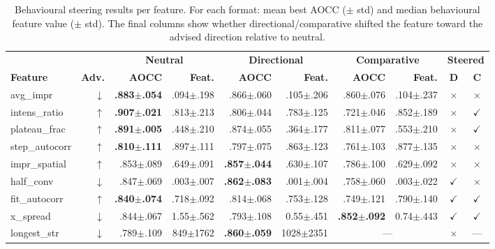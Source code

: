 \begin{table}[!t]
\centering
\caption{Behavioural steering results per feature. For each format: mean best AOCC ($\pm$ std) and median behavioural feature value ($\pm$ std). The final columns show whether directional/comparative shifted the feature toward the advised direction relative to neutral.}
\label{tab:steering-detail}
\footnotesize
\setlength{\tabcolsep}{3.5pt}
\begin{tabular}{@{}lr|rr|rr|rr|cc@{}}
\toprule
& & \multicolumn{2}{c|}{\textbf{Neutral}} & \multicolumn{2}{c|}{\textbf{Directional}} & \multicolumn{2}{c|}{\textbf{Comparative}} & \multicolumn{2}{c}{\textbf{Steered}} \\
\textbf{Feature} & \textbf{Adv.} & \textbf{AOCC} & \textbf{Feat.} & \textbf{AOCC} & \textbf{Feat.} & \textbf{AOCC} & \textbf{Feat.} & \textbf{D} & \textbf{C} \\
\midrule
avg\_impr      & $\downarrow$ & \textbf{.883$\pm$.054} & .094$\pm$.198 & .866$\pm$.060 & .105$\pm$.206 & .860$\pm$.076 & .104$\pm$.237 & $\times$ & $\times$ \\
intens\_ratio  & $\uparrow$   & \textbf{.907$\pm$.021} & .813$\pm$.213 & .806$\pm$.044 & .783$\pm$.125 & .721$\pm$.046 & .852$\pm$.189 & $\times$ & $\checkmark$ \\
plateau\_frac  & $\uparrow$   & \textbf{.891$\pm$.005} & .448$\pm$.210 & .874$\pm$.055 & .364$\pm$.177 & .811$\pm$.077 & .553$\pm$.210 & $\times$ & $\checkmark$ \\
step\_autocorr & $\uparrow$   & \textbf{.810$\pm$.111} & .897$\pm$.111 & .797$\pm$.075 & .863$\pm$.123 & .761$\pm$.103 & .877$\pm$.135 & $\times$ & $\times$ \\
impr\_spatial  & $\uparrow$   & .853$\pm$.089 & .649$\pm$.091 & \textbf{.857$\pm$.044} & .630$\pm$.107 & .786$\pm$.100 & .629$\pm$.092 & $\times$ & $\times$ \\
half\_conv     & $\downarrow$ & .847$\pm$.069 & .003$\pm$.007 & \textbf{.862$\pm$.083} & .001$\pm$.004 & .758$\pm$.060 & .003$\pm$.022 & $\checkmark$ & $\times$ \\
fit\_autocorr  & $\uparrow$   & \textbf{.840$\pm$.074} & .718$\pm$.092 & .814$\pm$.068 & .753$\pm$.128 & .749$\pm$.121 & .790$\pm$.140 & $\checkmark$ & $\checkmark$ \\
x\_spread      & $\downarrow$ & .844$\pm$.067 & 1.55$\pm$.562 & .793$\pm$.108 & 0.55$\pm$.451 & \textbf{.852$\pm$.092} & 0.74$\pm$.443 & $\checkmark$ & $\checkmark$ \\
longest\_str   & $\downarrow$ & .789$\pm$.109 & 849$\pm$1762  & \textbf{.860$\pm$.059} & 1028$\pm$2351 & \multicolumn{2}{c|}{---} & $\times$ & --- \\

\end{tabular}
\end{table}
